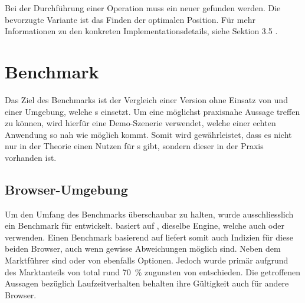 Bei der Durchführung einer  Operation muss ein neuer  gefunden werden. Die bevorzugte Variante ist das Finden der optimalen Position. Für mehr Informationen zu den konkreten Implementationsdetails, siehe  Sektion 3.5 \cite{quadridBasedSurfaceSimplification}.

\section{Benchmark}

Das Ziel des Benchmarks ist der Vergleich einer Version ohne Einsatz von  und einer Umgebung, welche s einsetzt. Um eine möglichst praxisnahe Aussage treffen zu können, wird hierfür eine Demo-Szenerie verwendet, welche einer echten Anwendung so nah wie möglich kommt. Somit wird gewährleistet, dass es nicht nur in der Theorie einen Nutzen für s gibt, sondern dieser in der Praxis vorhanden ist.

\subsection{Browser-Umgebung}
Um den Umfang des Benchmarks überschaubar zu halten, wurde ausschliesslich ein Benchmark für  entwickelt.
 basiert auf , dieselbe Engine, welche auch  oder  verwenden.
Einen Benchmark basierend auf  liefert somit auch Indizien für diese beiden Browser, auch wenn gewisse Abweichungen möglich sind.
Neben dem Marktführer  sind  oder  von  ebenfalls Optionen. Jedoch wurde primär aufgrund des Marktanteils von total rund 70 \% \cite{browserUsage} zugunsten von  entschieden.
Die getroffenen Aussagen bezüglich Laufzeitverhalten behalten ihre Gültigkeit auch für andere Browser.

